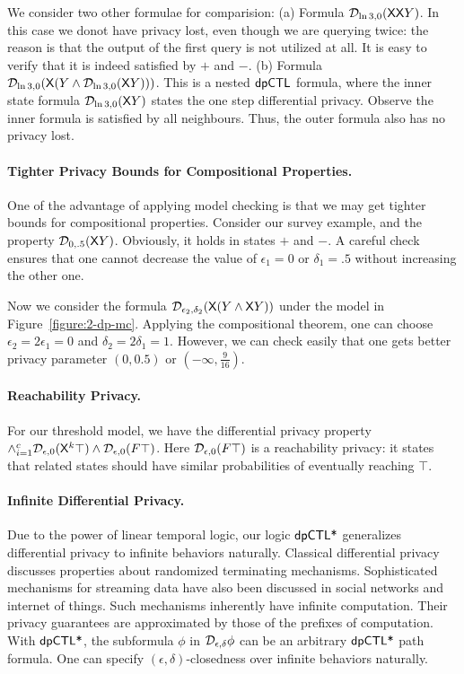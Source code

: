 We consider two other formulae for comparision: 
(a) Formula $\mathcal{D}_{{\ln 3}, {0}} (\mathsf{X} \mathsf{X} Y)$. In this case we donot have privacy lost, even though we are querying twice: the reason is that the output of the first query is not utilized at all. It is easy to verify that it is indeed satisfied by $+$ and $-$.
(b) Formula $\mathcal{D}_{{\ln 3}, {0}} (\mathsf{X} (Y\wedge \mathcal{D}_{{\ln 3}, {0}}(\mathsf{X} Y)))$. This is a nested $\textsf{dpCTL}$ formula, where the inner state formula $\mathcal{D}_{{\ln 3}, {0}}(\mathsf{X} Y)$ states the one step differential privacy. Observe the inner formula is satisfied by all neighbours. Thus, the outer formula also has no privacy lost.

\paragraph{Tighter Privacy Bounds for Compositional Properties.}
One of the advantage of applying model checking is that we may get tighter bounds for compositional properties. Consider our survey example, and the property $\mathcal{D}_{{0}, {.5}} (\mathsf{X} Y)$. Obviously, it holds in states $+$ and $-$. A careful check ensures that one cannot decrease the value of $\epsilon_1=0$ or $\delta_1=.5$ without increasing the other one.


Now we consider the formula $\mathcal{D}_{{\epsilon_2}, {\delta_2}} (\mathsf{X} (Y\wedge \mathsf{X} Y))$ under the model in Figure~\ref{figure:2-dp-mc}. Applying the compositional theorem, one can choose $\epsilon_2=2\epsilon_1=0$ and $\delta_2=2\delta_1=1$. However, we can check easily that one gets better privacy parameter $(0,0.5)$ or $(-\infty,\frac{9}{16})$. 

\paragraph{Reachability Privacy.}
For our threshold  model, we have the differential privacy property $\wedge_{i=1}^{c} \mathcal{D}_{{\epsilon}, {0}}(\mathsf{X}^k \top) \wedge \mathcal{D}_{{\epsilon}, {0}}(F \top)$. Here $\mathcal{D}_{{\epsilon}, {0}}(F \top)$ is a reachability privacy: it states that related states should have similar probabilities of eventually reaching $\top$.

\paragraph{Infinite Differential Privacy.}
Due to the power of linear temporal logic, our logic $\textsf{dpCTL*}$ generalizes differential privacy to infinite
behaviors naturally. Classical differential privacy discusses properties about
randomized terminating mechanisms. Sophisticated mechanisms for
streaming data have also been discussed in social networks and
internet of things. Such mechanisms inherently have infinite
computation. Their privacy guarantees are approximated by those of the
prefixes of computation.
With $\textsf{dpCTL*}$, the subformula $\phi$ in $\mathcal{D}_{{\epsilon}, {\delta}} \phi$
can be an arbitrary $\textsf{dpCTL*}$ path formula. One can specify
$(\epsilon, \delta)$-closedness over infinite behaviors naturally. 

